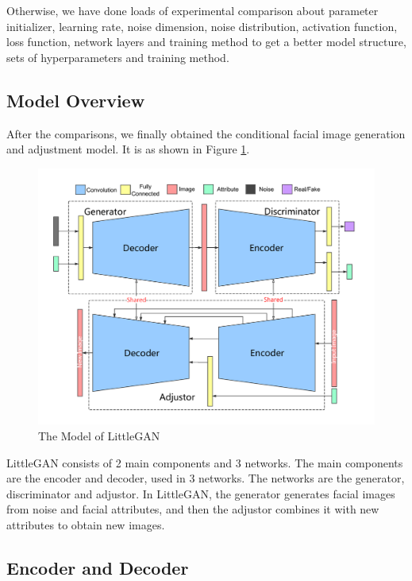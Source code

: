 Otherwise, we have done loads of experimental comparison about parameter initializer,
    learning rate, noise dimension, noise distribution, activation function,
    loss function, network layers and training method to get a better model structure,
    sets of hyperparameters and training method.

\subsection{Model Overview}

After the comparisons, we finally obtained the conditional facial image generation and adjustment model.
It is as shown in Figure \ref{smliegan}.

\begin{figure}
    \begin{center}
    \includegraphics[width=\textwidth]{figures/architecture.pdf}
    \caption{The Model of LittleGAN}
    \label{smliegan}
    \end{center}
\end{figure}

LittleGAN consists of 2 main components and 3 networks.
The main components are the encoder and decoder, used in 3 networks.
The networks are the generator, discriminator and adjustor.
In LittleGAN, the generator generates facial images from noise and facial attributes,
    and then the adjustor combines it with new attributes to obtain new images.


\subsection{Encoder and Decoder}


